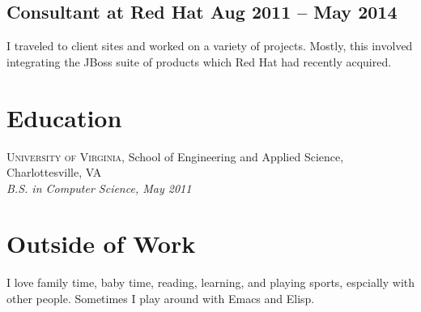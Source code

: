 \documentclass[12pt]{article}
\begin{document}
     
\tag{\LaTeX}

\subsection*{Consultant at Red Hat \hfill Aug 2011 -- May 2014}

I traveled to client sites and worked on a variety of projects. Mostly, this
involved integrating the JBoss suite of products which Red Hat had recently
acquired.

    
  


\section*{Education}

\textsc{University of Virginia}, School of Engineering and Applied Science,
Charlottesville, VA \\
\textit{B.S. in Computer Science, May 2011}


\section*{Outside of Work}

I love family time, baby time, reading, learning, and playing sports, espcially
with other people. Sometimes I play around with Emacs and Elisp.
\end{document}
